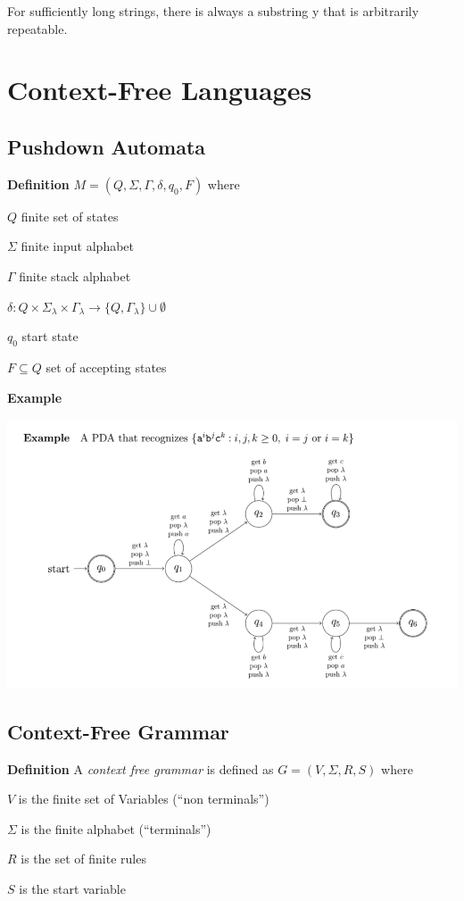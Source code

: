 \documentclass[oneside, 12pt]{book}
\begin{document}
For sufficiently long strings, there is always a substring y that is arbitrarily repeatable.

\chapter{Context-Free Languages}

\section{Pushdown Automata}

\textbf{Definition} $M = (Q,\Sigma, \Gamma, \delta, q_{0}, F)$ where

$Q$ finite set of states

$\Sigma$ finite input alphabet

$\Gamma$ finite stack alphabet

$\delta: Q\times \Sigma_{\lambda} \times \Gamma_{\lambda}\to \{Q,\Gamma_{\lambda}\}\cup \emptyset$

$q_{0}$ start state

$F\subseteq Q$ set of accepting states


\textbf{Example}


\includegraphics[width=\textwidth]{expda}



\section{Context-Free Grammar}

\textbf{Definition} A \emph{context free grammar} is defined as $G=(V,\Sigma, R,S)$ where

$V$ is the finite set of Variables (``non terminals'')

$\Sigma$ is the finite alphabet (``terminals'')

$R$ is the set of finite rules

$S$ is the start variable
\end{document}
